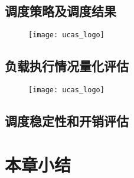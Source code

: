     \subsection{调度策略及调度结果}\label{subsec:strategies_and_schedules}
    \begin{figure}[!htbp]
        \centering
        \texttt{[image: ucas\_logo]}
        \bicaption{\quad }
        {\quad }
        \label{fig:xx}
    \end{figure}
    \subsection{负载执行情况量化评估}\label{subsec:quantified_comparison}
    \begin{figure}[!htbp]
        \centering
        \texttt{[image: ucas\_logo]}
        \bicaption{\quad }
        {\quad }
        \label{fig:xx}
    \end{figure}

    \subsection{调度稳定性和开销评估}\label{subsec:scheduling_stability_and_costs_analysis}

\section{本章小结}\label{sec:RAA_summary}

